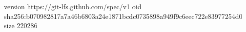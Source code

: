version https://git-lfs.github.com/spec/v1
oid sha256:b070982817a7a46b6803a24e1871bcdc0735898a949f9c6eec722e83977254d0
size 220286
